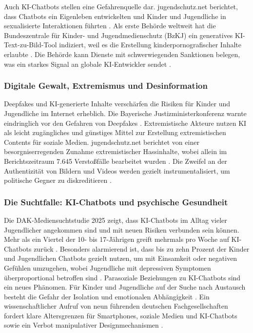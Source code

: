 \documentclass[12pt,a4paper]{article}
\begin{document}
	Auch KI-Chatbots stellen eine Gefahrenquelle dar. jugendschutz.net berichtet, dass Chatbots ein Eigenleben entwickelten und Kinder und Jugendliche in sexualisierte Interaktionen führten \cite{jugendschutz2025}. Als erste Behörde weltweit hat die Bundeszentrale für Kinder- und Jugendmedienschutz (BzKJ) ein generatives KI-Text-zu-Bild-Tool indiziert, weil es die Erstellung kinderpornografischer Inhalte erlaubte \cite{BzKJ2025}. Die Behörde kann Dienste mit schwerwiegenden Sanktionen belegen, was ein starkes Signal an globale KI-Entwickler sendet \cite{BzKJ2025a}.
	
	\subsubsection{Digitale Gewalt, Extremismus und Desinformation}
	
	Deepfakes und KI-generierte Inhalte verschärfen die Risiken für Kinder und Jugendliche im Internet erheblich. Die Bayerische Justizministerkonferenz warnte eindringlich vor den Gefahren von Deepfakes \cite{BayJumko2025}. Extremistische Akteure nutzen KI als leicht zugängliches und günstiges Mittel zur Erstellung extremistischen Contents für soziale Medien. jugendschutz.net berichtet von einer besorgniserregenden Zunahme extremistischer Hassinhalte, wobei allein im Berichtszeitraum 7.645 Verstoßfälle bearbeitet wurden \cite{jugendschutz2025}. Die Zweifel an der Authentizität von Bildern und Videos werden gezielt instrumentalisiert, um politische Gegner zu diskreditieren \cite{Tagesschau2025a}.
	
	\subsubsection{Die Suchtfalle: KI-Chatbots und psychische Gesundheit}
	
	Die DAK-Mediensuchtstudie 2025 zeigt, dass KI-Chatbots im Alltag vieler Jugendlicher angekommen sind und mit neuen Risiken verbunden sein können. Mehr als ein Viertel der 10- bis 17-Jährigen greift mehrmals pro Woche auf KI-Chatbots zurück \cite{DAK2025}. Besonders alarmierend ist, dass bis zu zehn Prozent der Kinder und Jugendlichen Chatbots gezielt nutzen, um mit Einsamkeit oder negativen Gefühlen umzugehen, wobei Jugendliche mit depressiven Symptomen überproportional betroffen sind \cite{DAK2025}. Parasoziale Beziehungen zu KI-Chatbots sind ein neues Phänomen. Für Kinder und Jugendliche auf der Suche nach Austausch besteht die Gefahr der Isolation und emotionalen Abhängigkeit \cite{DAK2025}. Ein wissenschaftlicher Aufruf von neun führenden deutschen Fachgesellschaften fordert klare Altersgrenzen für Smartphones, soziale Medien und KI-Chatbots sowie ein Verbot manipulativer Designmechanismen \cite{Fachgesellschaften2025}.
	
\end{document}
